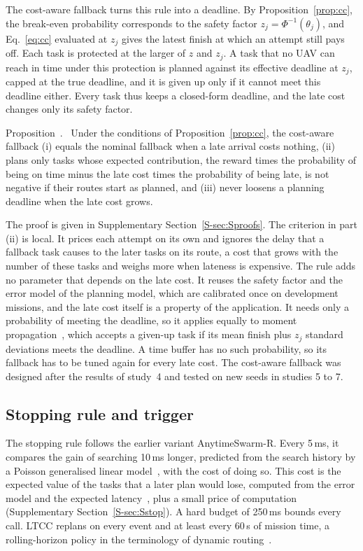 \documentclass[a4paper,fleqn]{cas-dc}
\newcommand{\mname}{LTCC}  %
\newcounter{prop}
\newenvironment{prop}{\par\smallskip\refstepcounter{prop}\noindent Proposition~\theprop.\ }{\par\smallskip}
\begin{document}
The cost-aware fallback turns this rule into a deadline. By Proposition~\ref{prop:cc}, the break-even probability
corresponds to the safety factor $z_j=\Phi^{-1}(\theta_j)$, and Eq.~\eqref{eq:cc} evaluated at $z_j$ gives the latest
finish at which an attempt still pays off. Each task is protected at the larger of $z$ and $z_j$. A task that no UAV can
reach in time under this protection is planned against its effective deadline at $z_j$, capped at the true deadline,
and it is given up only if it cannot meet this deadline either. Every task thus keeps a closed-form deadline, and the
late cost changes only its safety factor.

\begin{prop}\label{prop:costfb}
Under the conditions of Proposition~\ref{prop:cc}, the cost-aware fallback (i) equals the nominal fallback when a late
arrival costs nothing, (ii) plans only tasks whose expected contribution, the reward times the probability of being on
time minus the late cost times the probability of being late, is not negative if their routes start as planned, and
(iii) never loosens a planning deadline when the late cost grows.
\end{prop}

The proof is given in Supplementary Section~\ref{S-sec:Sproofs}. The criterion in part (ii) is local. It prices each
attempt on its own and ignores the delay that a fallback task causes to the later tasks on its route, a cost that grows
with the number of these tasks and weighs more when lateness is expensive. The rule adds no parameter that depends on
the late cost. It reuses the safety factor and the error model of the planning model, which are calibrated once on
development missions, and the late cost itself is a property of the application. It needs only a probability
of meeting the deadline, so it applies equally to moment propagation~\cite{ehmke2015ensuring}, which accepts a given-up
task if its mean finish plus $z_j$ standard deviations meets the deadline. A time buffer has no such probability, so its
fallback has to be tuned again for every late cost. The cost-aware fallback was designed after the results of study~4
and tested on new seeds in studies 5 to 7.

\subsection{Stopping rule and trigger}\label{sec:stop}
The stopping rule follows the earlier variant AnytimeSwarm-R. Every 5\,ms, it compares the gain of searching 10\,ms
longer, predicted from the search history by a Poisson generalised linear model~\cite{mccullagh1989glm}, with the cost
of doing so. This cost is the expected value of the tasks that a later plan would lose, computed from the error model
and the expected latency~\cite{savelsbergh1992vrptw}, plus a small price of computation (Supplementary
Section~\ref{S-sec:Sstop}). A hard budget of 250\,ms bounds every call. \mname{} replans on every event and at least
every 60\,s of mission time, a rolling-horizon policy in the terminology of dynamic routing~\cite{soeffker2022review}.
\end{document}
